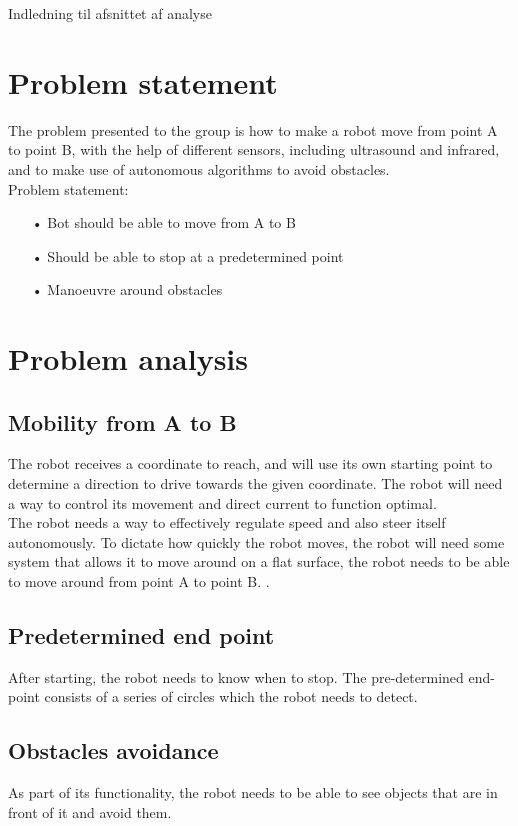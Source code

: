 Indledning til afsnittet af analyse\\

\section{Problem statement}

The problem presented to the group is how to make a robot move from point A to point B, with the help of different sensors, including ultrasound and infrared, and to make use of autonomous algorithms to avoid obstacles. \\

Problem statement:
\begin{enumerate}
\item[•]Bot should be able to move from A to B
\item[•]Should be able to stop at a predetermined point
\item[•]Manoeuvre around obstacles
\end{enumerate}

\section{Problem analysis}
\subsection{Mobility from A to B}
The robot receives a coordinate to reach, and will use its own starting point to determine a direction to drive towards the given coordinate. The robot will need a way to control its movement and direct current to function optimal.\\
The robot needs a way to effectively regulate speed and also steer itself autonomously. To dictate how quickly the robot moves, the robot will need some system that allows it to move around on a flat surface, the robot needs to be able to move around from point A to point B.
.\

\subsection{Predetermined end point}
After starting, the robot needs to know when to stop. The pre-determined end-point consists of a series of circles which the robot needs to detect. 

\subsection{Obstacles avoidance}
As part of its functionality, the robot needs to be able to see objects that are in front of it and avoid them. 